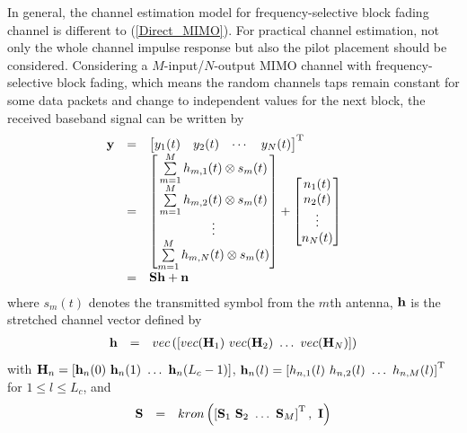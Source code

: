 \documentclass[10pt,fleqn, twocolumn]{IEEEtran}
\newcommand{\bh}{{\bf h}}
\newcommand{\bH}{{\bf H}}
\newcommand{\bn}{{\bf n}}
\newcommand{\by}{{\bf y}}
\newcommand{\bS}{{\bf S}}
\newcommand{\bI}{{\bf I}}
\begin{document}
In general, the channel estimation model for frequency-selective
block fading channel is different to (\ref{Direct_MIMO}). For
practical channel estimation, not only the whole channel impulse
response but also the pilot placement should be considered.
Considering a $M$-input/$N$-output MIMO channel with
frequency-selective block fading, which means the random channels
taps remain constant for some data packets and change to
independent values for the next block, the received baseband
signal can be written by
\begin{equation}\hspace{-0.20in}
\begin{array}{rcl}
\by&=&\left[\begin{matrix}y_{1}(t)&y_{2}(t)&\cdots&y_{N}(t)\end{matrix}\right]^{\rm T}\\
&=&\left[\begin{matrix}\sum\limits_{m=1}^{M}h_{m,1}(t)\otimes s_m(t)\\ \sum\limits_{m=1}^{M}h_{m,2}(t)\otimes s_m(t)\\ \vdots \\
\sum\limits_{m=1}^{M}h_{m,N}(t)\otimes
s_m(t)\end{matrix}\right]+\left[\begin{matrix}n_{1}(t)\\ n_{2}(t)\\ \vdots\\
n_{N}(t)\end{matrix}\right]\\
&=&\bS\bh+\bn
\end{array}
\end{equation}
\noindent where $s_m(t)$ denotes the transmitted symbol from the
$m$th antenna, $\bh$ is the stretched channel vector defined by
\begin{equation}\hspace{-0.00in}
\begin{array}{rcl}
\bh&=&\mbox{vec}\left(\left[\mbox{vec}(\bH_{1})\
\mbox{vec}(\bH_{2})\ \ldots\ \mbox{vec}(\bH_{N})\right]\right)
\end{array}
\end{equation}
\noindent with $\bH_{n}=\left[\bh_{n}(0)\ \bh_{n}(1)\ \ldots\
\bh_{n}(L_{c}-1)\right]$, $\bh_{n}(l)=\left[h_{n,1}(l)\
h_{n,2}(l)\ \ldots\ h_{n,M}(l)\right]^{\rm T}$ for $1\leq l \leq
L_{c}$, and
\begin{equation}\hspace{-0.00in}
\begin{array}{rcl}
\bS&=&\mbox{kron}\left(\left[\bS_{1}\ \bS_{2}\ \ldots\
\bS_{M}\right]^{\rm T},\ \bI\right)
\end{array}
\end{equation}
\end{document}
